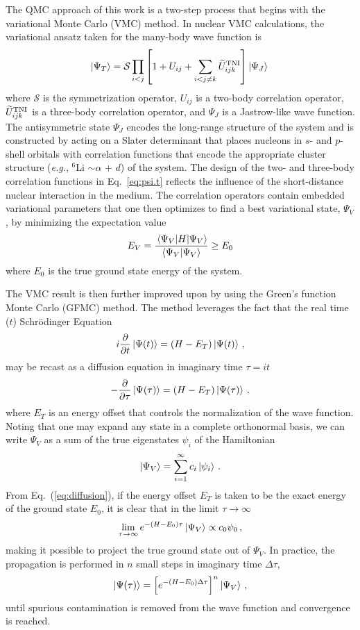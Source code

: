 \documentclass[aps,prc,floatfix,showpacs,twocolumn, preprintnumbers]{revtex4-2}
\newcommand{\beq}{\begin{equation}}
\newcommand{\eeq}{\end{equation}}
\newcommand{\inner}[2]{\langle #1 | #2 \rangle}
\def\beq{\begin{equation}}
\def\eeq{\end{equation}}
\begin{document}
The QMC approach of this work is a two-step process that begins with the variational Monte Carlo (VMC) method. In nuclear VMC calculations, the variational ansatz taken for the many-body wave function is~\cite{Pudliner:1997ck}
\beq
\ket{\Psi_T} = \mathcal{S}\prod_{i<j}\left[ 1 + U_{ij} + \sum_{i<j\neq k} \widetilde{U}^{\rm TNI}_{ijk} \right] \ket{\Psi_J}\, \label{eq:psi.t}
\eeq
where $\mathcal{S}$ is the symmetrization operator, $U_{ij}$ is a two-body correlation operator, $\widetilde{U}^{\rm TNI}_{ijk}$ is a three-body correlation operator, and $\Psi_J$ is a Jastrow-like wave function.
The antisymmetric state $\Psi_J$ encodes the long-range structure of the system and is constructed by acting on a Slater determinant that places nucleons in $s$- and $p$-shell orbitals with correlation functions that encode the appropriate cluster structure ({\it e.g.}, $^6$Li $\sim \alpha$ + $d$) of the system. 
The design of the two- and three-body correlation functions in Eq.~\ref{eq:psi.t} reflects the influence of the short-distance nuclear interaction in the medium. The correlation operators contain embedded variational parameters that one then optimizes to find a best variational state, $\Psi_V$, by minimizing the expectation value 
\beq
E_V = \frac{\mel{\Psi_V}{H}{\Psi_V}}{\inner{\Psi_V}{\Psi_V}} \geq E_0
\eeq
where $E_0$ is the true ground state energy of the system. 

The VMC result is then further improved upon by using the Green's function Monte Carlo (GFMC) method. The method leverages the fact that the real time ($t$) Schr\"{o}dinger Equation 
\beq
i\frac{\partial}{\partial t}\ket{\Psi(t)} = (H-E_T)\ket{\Psi(t)}\, ,
\eeq
may be recast as a diffusion equation in imaginary time $\tau=it$
\beq
-\frac{\partial}{\partial \tau}\ket{\Psi(\tau)} = (H-E_T)\ket{\Psi(\tau)}\, ,
\label{eq:diffusion}
\eeq
where $E_T$ is an energy offset that controls the normalization of the wave function. 
Noting that one may expand any state in a complete orthonormal basis, we can write $\Psi_V$ as a sum of the true eigenstates $\psi_i$ of the Hamiltonian 
\beq
\ket{\Psi_V} = \sum_{i=1}^{\infty} c_i\ket{\psi_i}\, .
\eeq
From Eq.~(\ref{eq:diffusion}), if the energy offset $E_T$ is taken to be the exact energy of the ground state $E_0$, it is clear that in the limit $\tau \to \infty$
\beq
\lim_{\tau\to\infty} e^{-(H-E_0)\tau}\ket{\Psi_V} \propto c_0\psi_0\, , 
\eeq
making it possible to project the true ground state out of $\Psi_V$.
In practice, the propagation is performed in $n$ small steps in imaginary time $\Delta\tau$,
\beq
\ket{\Psi(\tau)} = \left[ e^{-(H-E_0)\Delta\tau}\right]^n\ket{\Psi_V}\, ,
\eeq
until spurious contamination is removed from the wave function and convergence is reached.
\end{document}
